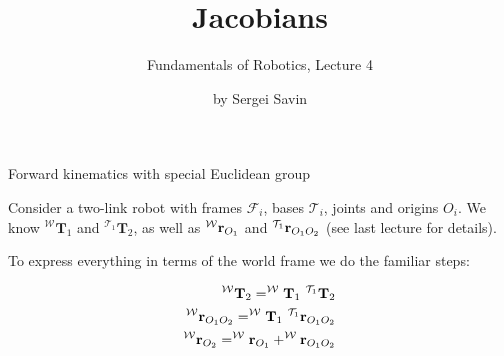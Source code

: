 \documentclass{beamer}
\title{Jacobians}
\subtitle{Fundamentals of Robotics, Lecture 4}
\author{by Sergei Savin}
\date{\mydate}
\begin{document}
\maketitle





\begin{frame}{Forward kinematics with special Euclidean group}
	\begin{flushleft}
		
		Consider a two-link robot with frames $\mathcal F_i$, bases $\mathcal T_i$, joints and origins $O_i$. We know $^{\mathcal W}\mathbf T_1$ and $^{\mathcal T_1} \mathbf T_2$, as well as $^{\mathcal W}\mathbf{r}_{O_1}$ and $^{\mathcal T_1}\mathbf{r}_{O_1 O_2}$ (see last lecture for details).
		
		\bigskip
		
		To express everything in terms of the world frame we do the familiar steps:
		
		\begin{align}
			^{\mathcal W}\mathbf T_2 = ^{\mathcal W}\mathbf T_1 \ ^{\mathcal T_1}\mathbf T_2 \\
			^{\mathcal W}\bo{r}_{O_1 O_2} = ^{\mathcal W}\mathbf T_1 \ ^{\mathcal T_1}\bo{r}_{O_1 O_2} \\
			^{\mathcal W}\bo{r}_{O_2} = ^{\mathcal W}\bo{r}_{O_1} +
			 ^{\mathcal W}\bo{r}_{O_1 O_2}
		\end{align}
		
	\end{flushleft}
\end{frame}
\end{document}

